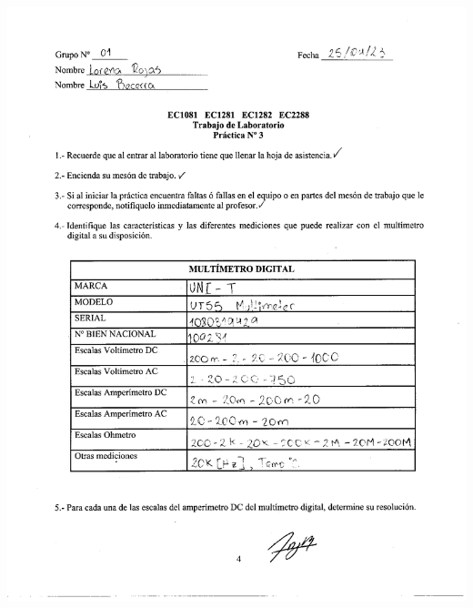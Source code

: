 \documentclass[12pt]{article}
\begin{document}
	\begin{center}
		\includegraphics[width=16cm,height=20cm]{Img/datos_lab_0001}
	\end{center}
\end{document}
